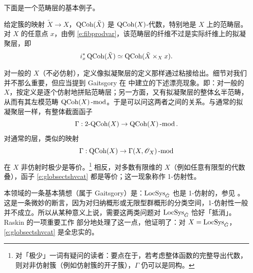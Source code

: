 下面是一个范畴层的基本例子。

\begin{ex}给定簇的映射 $\tilde{X} \rightarrow X$，$\operatorname{QCoh}(\tilde{X})$ 是 $\operatorname{QCoh}(X)$-代数，特别地是 $X$ 上的范畴层。对 $X$ 的任意点 $x$，由例 \ref{e:fibprodvar}，该范畴层的纤维不过是实际纤维上的拟凝聚层，即
%
\[
	  i_x^* \operatorname{QCoh}(\tilde{X}) \simeq \operatorname{QCoh}( \tilde{X} \times_X x).
\]
%
\end{ex}


\ssszh 对一般的 $X$（不必仿射），定义像拟凝聚层的定义那样通过粘接给出。细节对我们并不那么重要，但应当提到 Gaitsgory 在 \cite{1affine} 中建立的下述漂亮现象。即：对一般的 $X$，按定义是逐个仿射地拼贴范畴层；另一方面，又有拟凝聚层的整体幺半范畴，从而有其左模范畴 $\operatorname{QCoh}(X)\operatorname{-mod}$。于是可以问这两者之间的关系。与通常的拟凝聚层一样，有整体截面函子
%
\begin{equation} \label{e:globsectshvcat}
 \Gamma: \operatorname{2-QCoh}(X) \rightarrow \operatorname{QCoh}(X)\operatorname{-mod}.
\end{equation}
%
对通常的层，类似的映射
    \[
    \Gamma: \operatorname{QCoh}(X) \rightarrow \Gamma(X, \mathscr{O}_X)\operatorname{-mod}
    \]
	在 $X$ 非仿射时极少是等价。\footnote{对「极少」一词有疑问的读者：要点在于，若考虑整体函数的完整导出代数，则对非仿射簇（例如仿射簇的开子簇），$\Gamma$ 仍可以是同构。}
相反，对多数有限维的 $X$（例如任意有限型的代数叠），函子 \eqref{e:globsectshvcat} 都是等价；这一现象称作 1-仿射性。


本领域的一条基本猜想（属于 Gaitsgory）是：$\operatorname{LocSys}_{\check{G}}$ 也是 1-仿射的，参见 \cite{raskinspectraldecomp}。这是一条微妙的断言，因为对归纳概形或无限型群概形的分类空间，1-仿射性一般并不成立。所以从某种意义上说，需要这两类问题对 $\operatorname{LocSys}_{\check{G}}$ 恰好「抵消」。Raskin 的一项重要工作 \cite{raskinspectraldecomp} 部分地处理了这一点，他证明了：对 $X = \operatorname{LocSys}_{\check{G}}$，\eqref{e:globsectshvcat} 是全忠实的。
